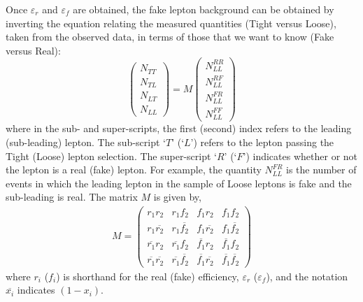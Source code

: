 Once $\varepsilon_r$ and $\varepsilon_f$ are obtained, the fake lepton background
can be obtained by inverting the equation relating the measured quantities (Tight versus Loose), taken
from the observed data, in terms
of those that we want to know (Fake versus Real):
\begin{equation}
    \begin{pmatrix}
        N_{TT} \\ N_{TL} \\ N_{LT} \\ N_{LL}
    \end{pmatrix}
        = M
    \begin{pmatrix}
        N_{LL}^{RR} \\ N_{LL}^{RF} \\ N_{LL}^{FR} \\ N_{LL}^{FF}
    \end{pmatrix}
    \label{eq:matrix_method}
\end{equation}
\noindent where in the sub- and super-scripts, the first (second) index refers to the leading (sub-leading) lepton.
The sub-script `$T$' (`$L$') refers to the lepton passing the Tight (Loose) lepton
selection.
The super-script `$R$' (`$F$') indicates whether or not the lepton is a real (fake) lepton.
For example, the quantity $N_{LL}^{FR}$ is the number of events in which the leading lepton
in the sample of Loose leptons is fake and the sub-leading is real.
The matrix $M$ is given by,
\begin{align}
    M = \begin{pmatrix}
            r_1 r_2 & r_1 f_2  & f_1 r_2 & f_1 f_2 \\
            r_1 \overline{r_2} & r_1\overline{f_2} & f_1 \overline{r_2} & f_1 \overline{f_2} \\
            \overline{r_1} r_2 & \overline{r_1} f_2 & \overline{f_1} r_2 & \overline{f_1} f_2 \\
            \overline{r_1} \overline{r_2} & \overline{r_1} \overline{f_2} & \overline{f_1} \overline{r_2} & \overline{f_1} \overline{f_2}
        \end{pmatrix}
    \label{eq:matrix_method_matrix}
\end{align}
where $r_i$ ($f_i$) is shorthand for the real (fake) efficiency, $\varepsilon_r$ ($\varepsilon_f$),
and the notation $\overline{x_i}$ indicates $(1 - x_i)$.

